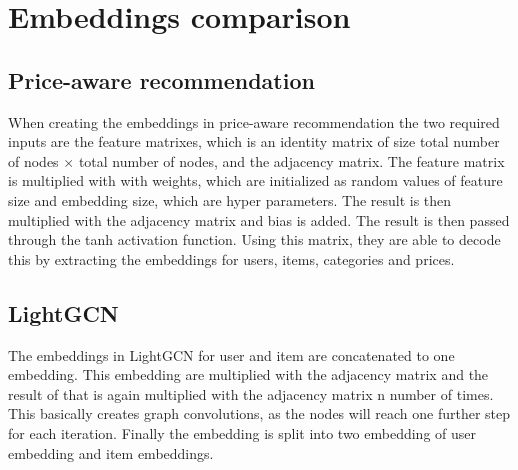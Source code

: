 \section{Embeddings comparison}
\subsection{Price-aware recommendation}
When creating the embeddings in price-aware recommendation the two required inputs are the feature matrixes, which is an identity matrix of size total number of nodes $\times$ total number of nodes, and the adjacency matrix.
The feature matrix is multiplied with with weights, which are initialized as random values of feature size and embedding size, which are hyper parameters.
The result is then multiplied with the adjacency matrix and bias is added.
The result is then passed through the tanh activation function.
Using this matrix, they are able to decode this by extracting the embeddings for users, items, categories and prices.

\subsection{LightGCN}
The embeddings in LightGCN for user and item are concatenated to one embedding.
This embedding are multiplied with the adjacency matrix and the result of that is again multiplied with the adjacency matrix n number of times.
This basically creates graph convolutions, as the nodes will reach one further step for each iteration.
Finally the embedding is split into two embedding of user embedding and item embeddings.